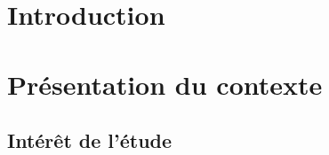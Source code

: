 \documentclass[
]{article}
\author{}
\date{\vspace{-2.5em}}
\begin{document}
\setcounter{tocdepth}{5}                
\renewcommand\contentsname{\begin{center}\textcolor{brown}{Sommaire}\end{center}}

\AtBeginShipout{
  \ifnum\value{page}=1\thispagestyle{empty}\fi}

\pagestyle{fancy}
\fancyhf{}
\renewcommand{\headrulewidth}{0.4pt}
\renewcommand{\footrulewidth}{0.4pt}
\fancyhead[R]{\textcolor{brown}{@Alex, Ali, Richard \& Toussaint}}
\fancyfoot[C]{\thepage}


\tableofcontents

\newpage

\renewcommand\listtablename{\begin{center}\textcolor{brown}{Liste des Tableaux}\end{center}}
\renewcommand\listfigurename{\begin{center}\textcolor{brown}{Liste des Figures}\end{center}} 

\setlength{\cftfignumwidth}{3em}
\setlength{\cfttabnumwidth}{3em}

\listoftables

\newpage

\listoffigures

\newpage

\section{Introduction}\label{introduction}

\section{Présentation du contexte}\label{pruxe9sentation-du-contexte}

\subsection{Intérêt de l'étude}\label{intuxe9ruxeat-de-luxe9tude}
\end{document}
